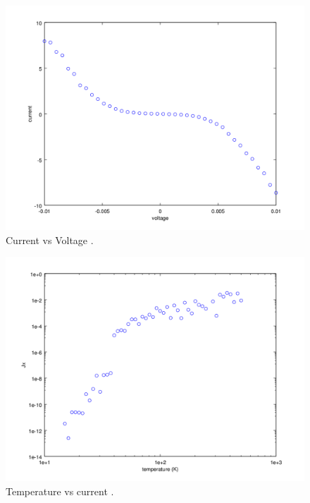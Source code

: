 \begin{figure}[htbp]
\begin{center}
\includegraphics[scale=.50]{VvJGreat.png}
\caption{Current vs Voltage .}
\label{JvsV}
\end{center}
\end{figure}

\begin{figure}[htbp]
\begin{center}
\includegraphics[scale=.50]{JvsT.png}
\caption{Temperature vs current .}
\label{TvJ}
\end{center}
\end{figure}


